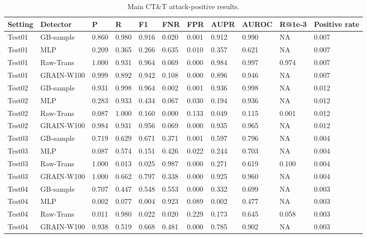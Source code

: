 \begin{table}[H]
\caption{Main CT\&T attack-positive results.}\label{tab:main}
\centering\small
\begin{tabular}{lllllllllll}
\hline
Setting & Detector & P & R & F1 & FNR & FPR & AUPR & AUROC & R@1e-3 & Positive rate \\
\hline
Test01 & GB-sample & 0.860 & 0.980 & 0.916 & 0.020 & 0.001 & 0.912 & 0.990 & NA & 0.007 \\
Test01 & MLP & 0.209 & 0.365 & 0.266 & 0.635 & 0.010 & 0.357 & 0.621 & NA & 0.007 \\
Test01 & Raw-Trans & 1.000 & 0.931 & 0.964 & 0.069 & 0.000 & 0.984 & 0.997 & 0.974 & 0.007 \\
Test01 & GRAIN-W100 & 0.999 & 0.892 & 0.942 & 0.108 & 0.000 & 0.896 & 0.946 & NA & 0.007 \\
Test02 & GB-sample & 0.931 & 0.998 & 0.964 & 0.002 & 0.001 & 0.936 & 0.998 & NA & 0.012 \\
Test02 & MLP & 0.283 & 0.933 & 0.434 & 0.067 & 0.030 & 0.194 & 0.936 & NA & 0.012 \\
Test02 & Raw-Trans & 0.087 & 1.000 & 0.160 & 0.000 & 0.133 & 0.049 & 0.115 & 0.001 & 0.012 \\
Test02 & GRAIN-W100 & 0.984 & 0.931 & 0.956 & 0.069 & 0.000 & 0.935 & 0.965 & NA & 0.012 \\
Test03 & GB-sample & 0.719 & 0.629 & 0.671 & 0.371 & 0.001 & 0.597 & 0.796 & NA & 0.004 \\
Test03 & MLP & 0.087 & 0.574 & 0.151 & 0.426 & 0.022 & 0.244 & 0.703 & NA & 0.004 \\
Test03 & Raw-Trans & 1.000 & 0.013 & 0.025 & 0.987 & 0.000 & 0.271 & 0.619 & 0.100 & 0.004 \\
Test03 & GRAIN-W100 & 1.000 & 0.662 & 0.797 & 0.338 & 0.000 & 0.925 & 0.960 & NA & 0.004 \\
Test04 & GB-sample & 0.707 & 0.447 & 0.548 & 0.553 & 0.000 & 0.332 & 0.699 & NA & 0.003 \\
Test04 & MLP & 0.002 & 0.077 & 0.004 & 0.923 & 0.089 & 0.002 & 0.477 & NA & 0.003 \\
Test04 & Raw-Trans & 0.011 & 0.980 & 0.022 & 0.020 & 0.229 & 0.173 & 0.645 & 0.058 & 0.003 \\
Test04 & GRAIN-W100 & 0.938 & 0.519 & 0.668 & 0.481 & 0.000 & 0.785 & 0.902 & NA & 0.003 \\
\hline
\end{tabular}
\end{table}
